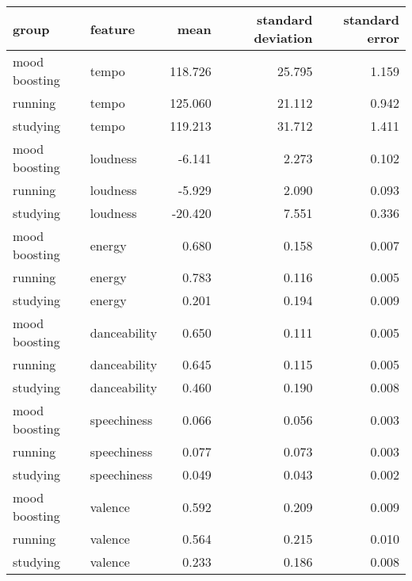 \begin{tabular}{llrrr}
\toprule
        group &      feature &    mean &  standard deviation &  standard error \\
\midrule
mood boosting &        tempo & 118.726 &              25.795 &           1.159 \\
      running &        tempo & 125.060 &              21.112 &           0.942 \\
     studying &        tempo & 119.213 &              31.712 &           1.411 \\
mood boosting &     loudness &  -6.141 &               2.273 &           0.102 \\
      running &     loudness &  -5.929 &               2.090 &           0.093 \\
     studying &     loudness & -20.420 &               7.551 &           0.336 \\
mood boosting &       energy &   0.680 &               0.158 &           0.007 \\
      running &       energy &   0.783 &               0.116 &           0.005 \\
     studying &       energy &   0.201 &               0.194 &           0.009 \\
mood boosting & danceability &   0.650 &               0.111 &           0.005 \\
      running & danceability &   0.645 &               0.115 &           0.005 \\
     studying & danceability &   0.460 &               0.190 &           0.008 \\
mood boosting &  speechiness &   0.066 &               0.056 &           0.003 \\
      running &  speechiness &   0.077 &               0.073 &           0.003 \\
     studying &  speechiness &   0.049 &               0.043 &           0.002 \\
mood boosting &      valence &   0.592 &               0.209 &           0.009 \\
      running &      valence &   0.564 &               0.215 &           0.010 \\
     studying &      valence &   0.233 &               0.186 &           0.008 \\
\bottomrule
\end{tabular}
